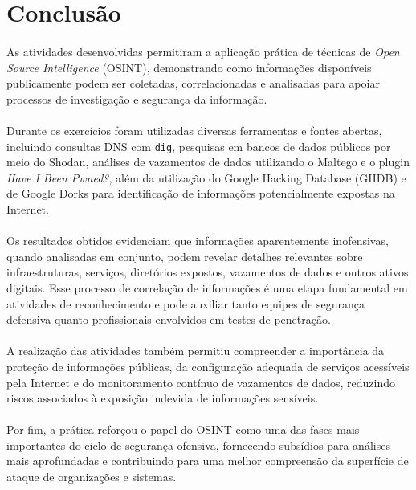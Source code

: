 \section{Conclusão}

\paragraph{}
As atividades desenvolvidas permitiram a aplicação prática de técnicas de
\textit{Open Source Intelligence} (OSINT), demonstrando como informações
disponíveis publicamente podem ser coletadas, correlacionadas e analisadas para
apoiar processos de investigação e segurança da informação.

\paragraph{}
Durante os exercícios foram utilizadas diversas ferramentas e fontes abertas,
incluindo consultas DNS com \texttt{dig}, pesquisas em bancos de dados públicos
por meio do Shodan, análises de vazamentos de dados utilizando o Maltego e o
plugin \textit{Have I Been Pwned?}, além da utilização do Google Hacking
Database (GHDB) e de Google Dorks para identificação de informações
potencialmente expostas na Internet.

\paragraph{}
Os resultados obtidos evidenciam que informações aparentemente inofensivas,
quando analisadas em conjunto, podem revelar detalhes relevantes sobre
infraestruturas, serviços, diretórios expostos, vazamentos de dados e outros
ativos digitais. Esse processo de correlação de informações é uma etapa
fundamental em atividades de reconhecimento e pode auxiliar tanto equipes de
segurança defensiva quanto profissionais envolvidos em testes de penetração.

\paragraph{}
A realização das atividades também permitiu compreender a importância da
proteção de informações públicas, da configuração adequada de serviços
acessíveis pela Internet e do monitoramento contínuo de vazamentos de dados,
reduzindo riscos associados à exposição indevida de informações sensíveis.

\paragraph{}
Por fim, a prática reforçou o papel do OSINT como uma das fases mais
importantes do ciclo de segurança ofensiva, fornecendo subsídios para análises
mais aprofundadas e contribuindo para uma melhor compreensão da superfície de
ataque de organizações e sistemas.
